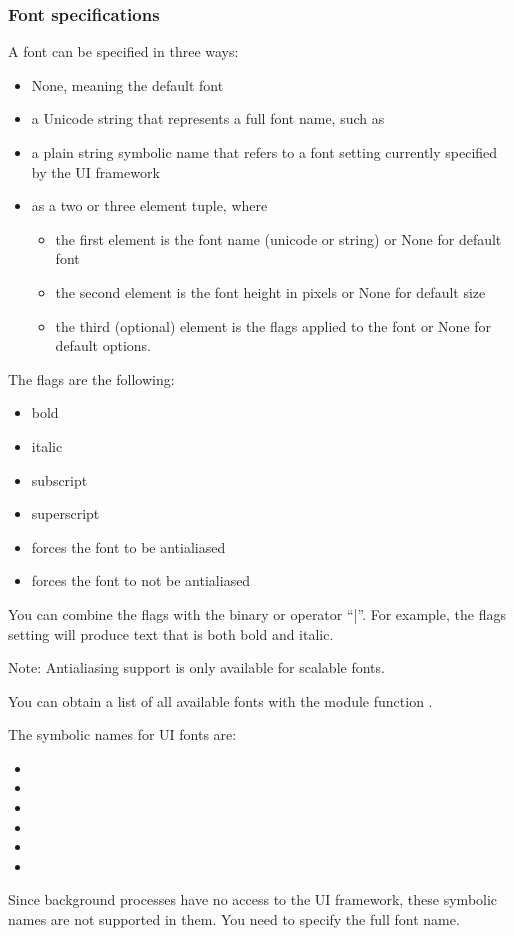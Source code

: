 \subsubsection{Font specifications}
\label{subsubsec:font-specs}
A font can be specified in three ways: 
\begin{itemize}
\item None, meaning the default font
\item a Unicode string that represents a full font name, such as 
\item a plain string symbolic name that refers to a font setting currently specified by 
the UI framework
\item as a two or three element tuple, where 
\begin{itemize}
\item the first element is the font name (unicode or string) or None for default font
\item the second element is the font height in pixels or None for default size
\item the third (optional) element is the flags applied to the font or None for default options.
\end{itemize}
\end{itemize}

The flags are the following:
\begin{itemize}
\item {} bold
\item {} italic
\item {} subscript
\item {} superscript
\item {} forces the font to be antialiased
\item {} forces the font to not be antialiased
\end{itemize}

You can combine the flags with the binary or operator ``|''. For
example, the flags setting  will produce
text that is both bold and italic.

Note: Antialiasing support is only available for scalable fonts.

You can obtain a list of all available fonts with the 
 module function .

The symbolic names for UI fonts are:
\begin{itemize}
\item {}
\item {}
\item {}
\item {}
\item {}
\item {}
\end{itemize}
Since background processes have no access to the UI framework, these 
symbolic names are not supported in them. You need to specify the full font 
name.

